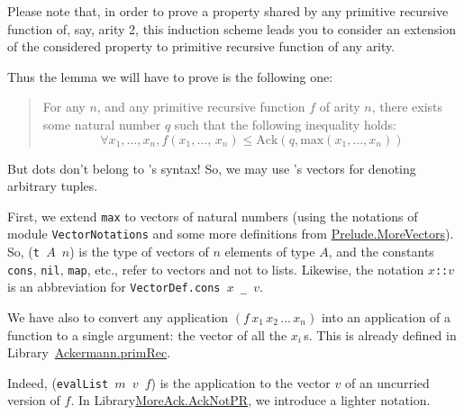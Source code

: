  


Please note that, in order to prove a property shared by any primitive recursive function of, say, arity 2, this induction scheme  leads you to consider an extension of the considered property to primitive recursive function of any arity.

Thus the lemma we will have to prove is the following one:


  \begin{quote}
    For any $n$, and any primitive recursive function $f$ of  arity $n$, there exists some natural number $q$ such that the following inequality holds:
 \[
  \forall x_1,\dots,x_n, 
      f(x_1,\dots,\,x_n)\leq\textrm{Ack}(q,\textrm{max}(x_1,\dots,x_n))
\]
 \end{quote}


But dots don't belong to \gallina's syntax! So, we may use \coq's vectors for denoting arbitrary tuples.

First, we extend \texttt{max} to vectors of natural numbers (using the notations of module \texttt{VectorNotations} and some more definitions from 
\href{../theories/html/hydras.Prelude.MoreVectors.html}{Prelude.MoreVectors}). So, (\texttt{t $A$ $n$}) is the type of vectors of $n$ elements of type $A$, and the constants \texttt{cons}, \texttt{nil}, \texttt{map}, etc., refer to vectors and not to lists. Likewise, the notation \texttt{$x$::$v$} is an abbreviation for
\texttt{VectorDef.cons $x$ \_ $v$}.











We have also to convert any application
$(f\,x_1\,x_2\,\dots\,x_n)$ into an application of a function 
to a single argument: the vector of all the $x_i$\,s.
This is already defined in 
Library~\href{../theories/html/hydras.Ackermann.primRec.html}{Ackermann.primRec}.




Indeed, (\texttt{evalList $m$ $v$ $f$}) is the application to the vector $v$ of
an uncurried version of $f$.
In Library\href{../theories/html/hydras.MoreAck.AckNotPR.html}{MoreAck.AckNotPR}, we introduce a lighter notation.


